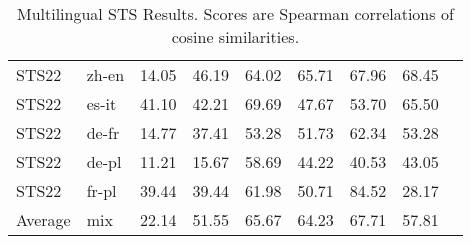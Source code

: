 \documentclass[11pt]{article}
\begin{document}
\begin{table*}[t!]
{\begin{tabular}{ll|ccccccc}
STS22 & zh-en & 14.05 & 46.19 & 64.02 & 65.71 & 67.96 & 68.45 \\
STS22 & es-it & 41.10 & 42.21 & 69.69 & 47.67 & 53.70 & 65.50 \\
STS22 & de-fr & 14.77 & 37.41 & 53.28 & 51.73 & 62.34 & 53.28 \\
STS22 & de-pl & 11.21 & 15.67 & 58.69 & 44.22 & 40.53 & 43.05 \\
STS22 & fr-pl & 39.44 & 39.44 & 61.98 & 50.71 & 84.52 & 28.17 \\
\midrule
\midrule
Average & mix & 22.14 & 51.55 & 65.67 & 64.23 & 67.71 & 57.81 \\
    \bottomrule
    \end{tabular}}
    \caption{Multilingual STS Results. Scores are Spearman correlations of cosine similarities.}
    \label{tab:addresultsmultsts}
\end{table*}
\end{document}
